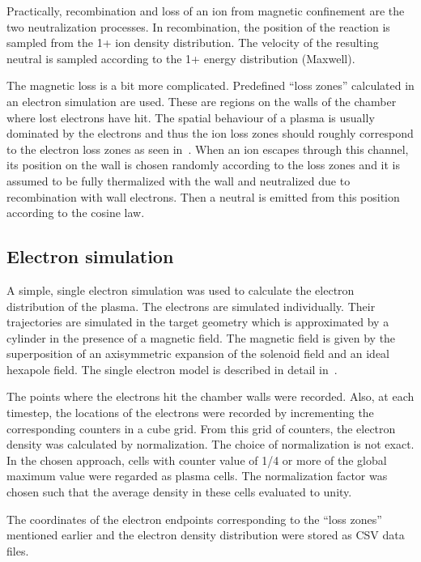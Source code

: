 \documentclass[a4paper,twoside,12pt]{article}
\begin{document}
Practically, recombination and loss of an ion from magnetic confinement are the two neutralization processes. In recombination, the position of the reaction is sampled from the 1+ ion density distribution. The velocity of the resulting neutral is sampled according to the 1+ energy distribution (Maxwell).

The magnetic loss is a bit more complicated. Predefined ``loss zones''
calculated in an electron simulation are used. These are regions on the walls
of the chamber where lost electrons have hit. The spatial behaviour of a plasma
is usually dominated by the electrons and thus the ion loss zones should
roughly correspond to the electron loss zones as seen in~\cite{kalvas:hiisi}. When an ion escapes through this channel, its position on the wall is chosen randomly according to the loss zones and it is assumed to be fully thermalized with the wall and neutralized due to recombination with wall electrons. Then a neutral is emitted from this position according to the cosine law.

\subsection{Electron simulation}
A simple, single electron simulation was used to calculate the electron distribution of the plasma. The electrons are simulated individually. Their trajectories are simulated in the target geometry which is approximated by a cylinder in the presence of a magnetic field. The magnetic field is given by the superposition of an axisymmetric expansion of the solenoid field and an ideal hexapole field. The single electron model is described in detail in~\cite{kalvas:hiisi}.

The points where the electrons hit the chamber walls were recorded. Also, at each timestep, the locations of the electrons were recorded by incrementing the corresponding counters in a cube grid. From this grid of counters, the electron density was calculated by normalization. The choice of normalization is not exact. In the chosen approach, cells with counter value of 1/4 or more of the global maximum value were regarded as plasma cells. The normalization factor was chosen such that the average density in these cells evaluated to unity.

The coordinates of the electron endpoints corresponding to the ``loss zones'' mentioned earlier and the electron density distribution were stored as CSV data files.
\end{document}

